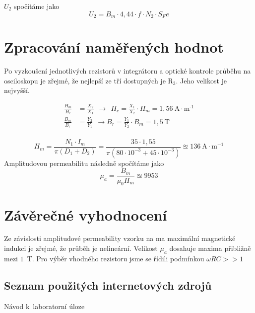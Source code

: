 \documentclass[a4paper,12pt]{article}   %
\begin{document}
$U_2$ spočítáme jako
\begin{equation}
  U_2 = B_m\cdot 4,44 \cdot f\cdot N_2\cdot S_Fe
\end{equation}

\section{Zpracování naměřených hodnot}
\label{chap:zpracovani_hodnot}

Po vyzkoušení jednotlivých rezistorů v integrátoru a optické kontrole průběhu na osciloskopu je zřejmé, že nejlepší ze tří dostupných je $\text{R}_\text{3}$. Jeho velikost je nejvyšší.

\begin{equation}
  \begin{split}
    \frac{H_m}{H_c} &= \frac{X_2}{X_1} ~~\rightarrow~~H_c = \frac{X_1}{X_2}\cdot H_m = 1,56~\text{A}\cdot\text{m}^\text{-1}\\
    \frac{B_m}{B_r} &= \frac{Y_2}{Y_1} ~~\rightarrow B_r = \frac{Y_1}{Y_2}\cdot B_m = 1,5~\text{T}\\
  \end{split}
\end{equation}

\begin{equation}
  H_m = \frac{N_1\cdot I_m}{\pi (D_1 + D_2)} = \frac{35 \cdot 1,55}{\pi (80\cdot 10^{-3} + 45\cdot 10^{-3})} \approxeq 136~\text{A}\cdot\text{m}^{-1}
\end{equation}
Amplitudovou permeabilitu následně spočítáme jako 
\begin{equation}
  \mu_a=\frac{B_m}{\mu_0 H_m} \approxeq 9953
\end{equation}


\section{Závěrečné vyhodnocení}
\label{chap:zaver}
Ze závislosti amplitudové permeability vzorku na ma maximální magnetické indukci je zřejmé, že průběh je nelineární. Velikost $\mu_a$ dosahuje maxima přibližně mezi $1$~T. Pro výběr vhodného rezistoru jsme se řídili podmínkou $\omega RC >> 1$


\clearpage
\renewcommand{\refname}{Seznam použité literatury a~zdrojů informací} 

\begin{thebibliography}{99}

\subsection*{Seznam použitých internetových zdrojů}
     Návod k~laboratorní úloze
    
\end{thebibliography}
\end{document}
